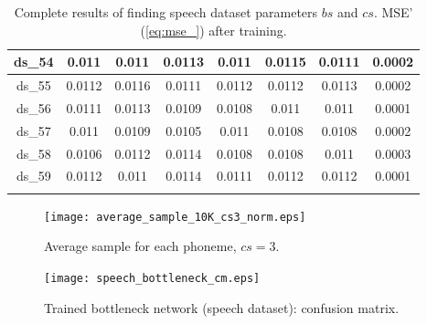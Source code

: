 \begin{longtable}{|c|c|c|c|c|c|c|c|}
ds\_54	& 0.011	& 0.011	& 0.0113	& 0.011	& 0.0115	& 0.0111	& 0.0002	\\ \hline
ds\_55	& 0.0112	& 0.0116	& 0.0111	& 0.0112	& 0.0112	& 0.0113	& 0.0002	\\ \hline
ds\_56	& 0.0111	& 0.0113	& 0.0109	& 0.0108	& 0.011	& 0.011	& 0.0001	\\ \hline
ds\_57	& 0.011	& 0.0109	& 0.0105	& 0.011	& 0.0108	& 0.0108	& 0.0002	\\ \hline
ds\_58	& 0.0106	& 0.0112	& 0.0114	& 0.0108	& 0.0108	& 0.011	& 0.0003	\\ \hline
ds\_59	& 0.0112	& 0.011	& 0.0114	& 0.0111	& 0.0112	& 0.0112	& 0.0001	\\ \hline
\caption{Complete results of finding speech dataset parameters $ bs $ and $ cs $. MSE' (\cref{eq:mse_}) after training.} \label{tab:app:speech_bs_cs_complete_results} \\
\end{longtable}

\begin{figure}[H]
\centering
\texttt{[image: average\_sample\_10K\_cs3\_norm.eps]}
\caption{Average sample for each phoneme, $ cs = 3 $.}
\label{fig:app:speech_average_sample_cs3}
\end{figure}

\begin{figure}[H]
\centering
\texttt{[image: speech\_bottleneck\_cm.eps]}
\caption{Trained bottleneck network (speech dataset): confusion matrix.}
\label{fig:app:speech_bottleneck_cm}
\end{figure}